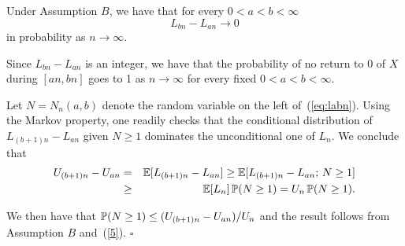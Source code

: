 \bigskip




\begin{lm}
\label{lm:cp}
Under Assumption $B$, we have that for every $0<a<b<\infty$
\begin{equation}
\label{eq:labn}
L_{bn}-L_{an}\to0
\end{equation}
in probability as $n\to\infty$.
\end{lm}

\begin{rmk}
 \label{rmk:labn}
Since $L_{bn}-L_{an}$ is an integer, we have that the probability of no return to $0$ of $X$ during $[an,bn]$ goes to 1 as $n\to\infty$ for every
fixed $0<a<b<\infty$.
\end{rmk}



Let $N=N_n(a,b)$ denote the random variable on the 
 left of~(\ref{eq:labn}). Using the Markov property, one readily checks that the conditional
distribution of $L_{(b+1)n}-L_{an}$ given $N\geq1$ dominates the unconditional one of $L_n$. 
We conclude that
\begin{eqnarray}\nn
U_{(b+1)n}-U_{an}\=\esp[L_{(b+1)n}-L_{an}]\geq\esp[L_{(b+1)n}-L_{an};\,N\geq1]\\
\label{eq:cp1}
&\geq&\esp[L_n]\,\P(N\geq1)=U_n\,\P(N\geq1).
\end{eqnarray}

We then have that $\P(N\geq1)\leq(U_{(b+1)n}-U_{an})/U_n$ and the result follows from Assumption $B$ and~(\ref{5}).
$\square$



